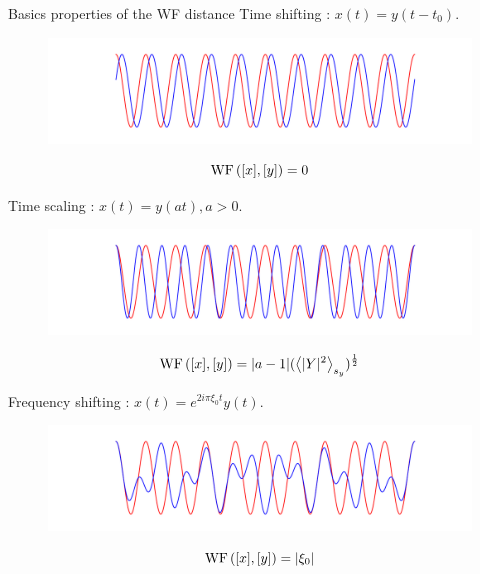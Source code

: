 \documentclass[pdf,aspectratio=169,10pt]{beamer}
\begin{document}
\begin{frame}{Basics properties of the WF distance}
    Time shifting : $x(t)=y(t-t_0)$.\\
    \begin{minipage}[c]{0.2\linewidth}
        \begin{figure}
            \includegraphics[scale=0.22]{../img/time_shift.pdf}
        \end{figure}
    \end{minipage}\hspace{4cm}
    \begin{minipage}[c]{0.4\linewidth}
        $$\operatorname{WF}\left([x],[y]\right)=0$$
    \end{minipage}

    Time scaling : $x(t)=y(at), a>0$.\\
    \begin{minipage}[c]{0.2\linewidth}
        \begin{figure}
            \includegraphics[scale=0.22]{../img/time_scaling.pdf}
        \end{figure}
    \end{minipage}\hspace{4cm}
    \begin{minipage}[c]{0.4\linewidth}
        $$\WF{x}{y}=\vert a-1\vert(\E{\vert Y\vert^2}_{s_y})^{\frac{1}{2}}$$
    \end{minipage}

    Frequency shifting : $x(t)=e^{2i\pi\xi_0t}y(t)$.\\
    \begin{minipage}[c]{0.2\linewidth} 
        \begin{figure}
            \includegraphics[scale=0.22]{../img/freq_shift.pdf}
        \end{figure}
    \end{minipage}\hspace{4cm} 
        \begin{minipage}[c]{0.4\linewidth}
            $$\operatorname{WF}\left([x],[y]\right)=\vert \xi_0\vert$$
        \end{minipage}
\end{frame}
\end{document}
